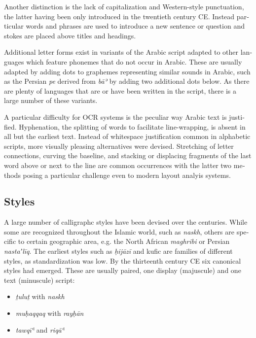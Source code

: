 \begin{french}
Another distinction is the lack of capitalization and Western-style
punctuation, the latter having been only introduced in the twentieth century
CE. Instead particular words and phrases are used to introduce a new sentence
or question and stokes are placed above titles and headings.

Additional letter forms exist in variants of the Arabic script adapted to other
languages which feature phonemes that do not occur in Arabic. These are usually
adapted by adding dots to graphemes representing similar sounds in Arabic, such
as the Persian \emph{pe} derived from \emph{bāʾ} by adding two additional dots
below. As there are plenty of languages that are or have been written in the
script, there is a large number of these variants.

A particular difficulty for OCR systems is the peculiar way Arabic text is
justified. Hyphenation, the splitting of words to facilitate line-wrapping, is
absent in all but the earliest text. Instead of whitespace justification common
in alphabetic scripts, more visually pleasing alternatives were devised.
Stretching of letter connections, curving the baseline, and stacking or
displacing fragments of the last word above or next to the line are common
occurrences with the latter two methods posing a particular challenge even to
modern layout analyis systems.

\subsection{Styles}

A large number of calligraphc styles have been devised over the centuries.
While some are recognized throughout the Islamic world, such as \emph{naskh},
others are specific to certain geographic area, e.g. the North African
\emph{maghribi} or Persian \emph{nastaʼlīq}. The earliest styles such as
\emph{ḥijāzī} and kufic are families of different styles, as standardization
was low. By the thirteenth century CE six canonical styles had emerged. These
are usually paired, one display (majuscule) and one text (minuscule) script:

\begin{itemize}
        \item \emph{ṯuluṯ} with \emph{naskh}
        \item \emph{muḥaqqaq} with \emph{rayḥān}
        \item \emph{tawqīʿ} and \emph{riqāʿ}
\end{itemize}


\end{french}
